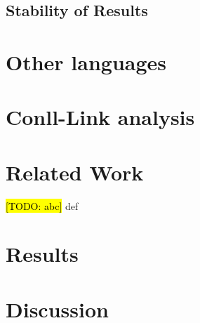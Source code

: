 \documentclass[11pt]{article}
\newcommand{\Note}[1]{}
\renewcommand{\Note}[1]{\hl{[#1]}}  %
\newcommand{\TODO}[1]{\Note{TODO: #1}}
\begin{document}
\subsection{Stability of Results}




\section{Other languages}


\section{Conll-Link analysis}




\section{Related Work}

\TODO {abc} def



\section{Results}


\section{Discussion}






\end{document}
